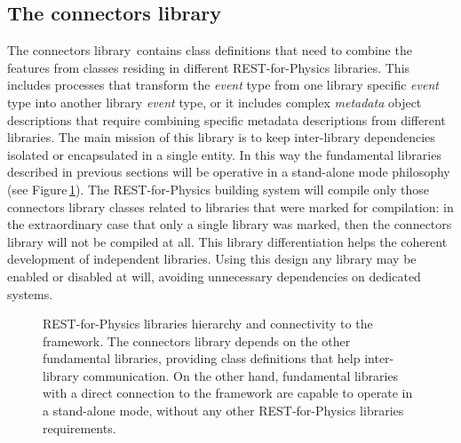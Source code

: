\subsection{The connectors library}\label{sc:connectorslib}

The connectors library\,\cite{REST_Connectors_Git} contains class definitions that need to combine the features from classes residing in different REST-for-Physics libraries. This includes processes that transform the \emph{event} type from one library specific \emph{event} type into another library \emph{event} type, or it includes complex \emph{metadata} object descriptions that require combining specific metadata descriptions from different libraries. The main mission of this library is to keep inter-library dependencies isolated or encapsulated in a single entity. In this way the fundamental libraries described in previous sections will be operative in a stand-alone mode philosophy (see Figure\,\ref{fig:connectorslib}). The REST-for-Physics building system will compile only those connectors library classes related to libraries that were marked for compilation: in the extraordinary case that only a single library was marked, then the connectors library will not be compiled at all. This library differentiation helps the coherent development of independent libraries. Using this design any library may be enabled or disabled at will, avoiding unnecessary dependencies on dedicated systems.

\begin{figure}[htb!]
  \centering
	\caption{REST-for-Physics libraries hierarchy and connectivity to the framework. The connectors library depends on the other fundamental libraries, providing class definitions that help inter-library communication. On the other hand, fundamental libraries with a direct connection to the framework are capable to operate in a stand-alone mode, without any other REST-for-Physics libraries requirements.}\label{fig:connectorslib}
\end{figure}

